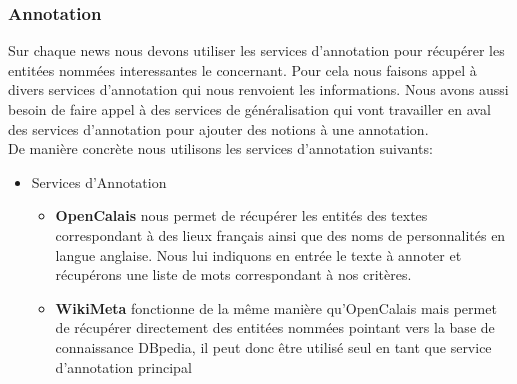 \documentclass[]{easychair}
\begin{document}
\subsubsection{Annotation }
Sur chaque news nous devons utiliser les services d'annotation pour récupérer les entitées nommées interessantes le concernant. Pour cela nous faisons appel à divers services d'annotation qui nous renvoient les informations. Nous avons aussi besoin de faire appel à des services de généralisation qui vont travailler en aval des services d'annotation pour ajouter des notions à une annotation.\\
De manière concrète nous utilisons les services d'annotation suivants:
\begin{itemize}
\item Services d'Annotation
\begin{itemize}
\item \textbf{OpenCalais} nous permet de récupérer les entités des textes correspondant à des lieux français ainsi que des noms de personnalités en langue anglaise. Nous lui indiquons en entrée le texte à annoter et récupérons une liste de mots correspondant à nos critères.
\item \textbf{WikiMeta} fonctionne de la même manière qu'OpenCalais mais permet de récupérer directement des entitées nommées pointant vers la base de connaissance DBpedia, il peut donc être utilisé seul en tant que service d'annotation principal
	
\end{itemize}


\end{itemize}
\end{document}
